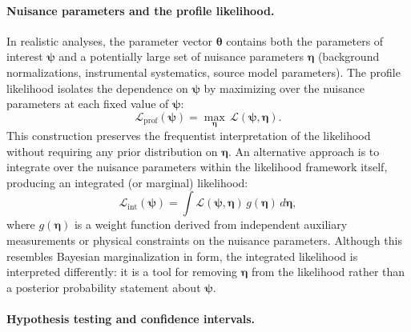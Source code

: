 \paragraph{Nuisance parameters and the profile likelihood.}

In realistic analyses, the parameter vector $\boldsymbol{\theta}$ contains both the parameters of interest $\boldsymbol{\psi}$ and a potentially large set of nuisance parameters $\boldsymbol{\eta}$ (background normalizations, instrumental systematics, source model parameters).
The profile likelihood isolates the dependence on $\boldsymbol{\psi}$ by maximizing over the nuisance parameters at each fixed value of $\boldsymbol{\psi}$:
\begin{equation}
	\mathcal{L}_{\mathrm{prof}}(\boldsymbol{\psi}) = \max_{\boldsymbol{\eta}} \, \mathcal{L}(\boldsymbol{\psi}, \boldsymbol{\eta}).
	\label{eq:profile_likelihood}
\end{equation}
This construction preserves the frequentist interpretation of the likelihood without requiring any prior distribution on $\boldsymbol{\eta}$.
An alternative approach is to integrate over the nuisance parameters within the likelihood framework itself, producing an integrated (or marginal) likelihood:
\begin{equation}
	\mathcal{L}_{\mathrm{int}}(\boldsymbol{\psi}) = \int \mathcal{L}(\boldsymbol{\psi}, \boldsymbol{\eta}) \, g(\boldsymbol{\eta}) \, d\boldsymbol{\eta},
	\label{eq:integrated_likelihood}
\end{equation}
where $g(\boldsymbol{\eta})$ is a weight function derived from independent auxiliary measurements or physical constraints on the nuisance parameters.
Although this resembles Bayesian marginalization in form, the integrated likelihood is interpreted differently: it is a tool for removing $\boldsymbol{\eta}$ from the likelihood rather than a posterior probability statement about $\boldsymbol{\psi}$.

\paragraph{Hypothesis testing and confidence intervals.}

